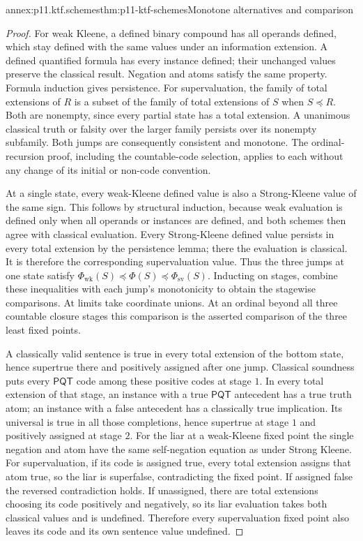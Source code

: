 \begin{annexitem}{annex:p11.ktf.schemes}{thm:p11-ktf-schemes}{Monotone alternatives and comparison}
\begin{proof}
For weak Kleene, a defined binary compound has all operands defined,
which stay defined with the same values under an information extension.
A defined quantified formula has every instance defined; their unchanged
values preserve the classical result. Negation and atoms satisfy the
same property. Formula induction gives persistence. For supervaluation,
the family of total extensions of \(R\) is a subset of the family
of total extensions of \(S\) when \(S\preceq R\). Both are
nonempty, since every partial state has a total extension. A unanimous
classical truth or falsity over the larger family persists over its
nonempty subfamily. Both jumps are consequently consistent and monotone.
The ordinal-recursion proof, including the countable-code selection,
applies to each without any change of its initial or non-code convention.

At a single state, every weak-Kleene defined value is also a Strong-Kleene
value of the same sign. This follows by structural induction, because
weak evaluation is defined only when all operands or instances are
defined, and both schemes then agree with classical evaluation.
Every Strong-Kleene defined value persists in every total extension by
the persistence lemma; there the evaluation is classical. It is therefore
the corresponding supervaluation value. Thus the three jumps at one state
satisfy \(\Phi_{\mathrm{wk}}(S)\preceq\Phi(S)\preceq
\Phi_{\mathrm{sv}}(S)\). Inducting on stages, combine these inequalities
with each jump's monotonicity to obtain the stagewise comparisons.
At limits take coordinate unions. At an ordinal beyond all three
countable closure stages this comparison is the asserted comparison of
the three least fixed points.

A classically valid sentence is true in every total extension of the
bottom state, hence supertrue there and positively assigned after one
jump. Classical soundness puts every \(\mathsf{PQT}\) code among
these positive codes at stage \(1\). In every total extension of that
stage, an instance with a true \(\mathsf{PQT}\) antecedent has a true
truth atom; an instance with a false antecedent has a classically true
implication. Its universal is true in all those completions, hence
supertrue at stage \(1\) and positively assigned at stage \(2\).
For the liar at a weak-Kleene fixed point the single negation
and atom have the same self-negation equation as under Strong Kleene.
For supervaluation, if its code is assigned true, every total extension
assigns that atom true, so the liar is superfalse, contradicting the
fixed point. If assigned false the reversed contradiction holds. If
unassigned, there are total extensions choosing its code positively
and negatively, so its liar evaluation takes both classical values
and is undefined. Therefore every supervaluation fixed point also
leaves its code and its own sentence value undefined.
\end{proof}
\end{annexitem}

